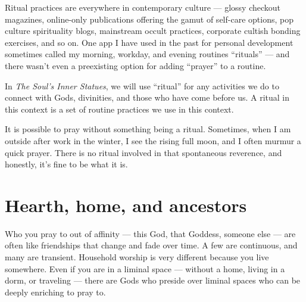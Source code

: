 \documentclass[
]{book}
\begin{document}
Ritual practices are everywhere in contemporary culture --- glossy checkout magazines, online-only publications offering the gamut of self-care options, pop culture spirituality blogs, mainstream occult practices, corporate cultish bonding exercises, and so on. One app I have used in the past for personal development sometimes called my morning, workday, and evening routines ``rituals'' --- and there wasn't even a preexisting option for adding ``prayer'' to a routine.

In \emph{The Soul's Inner Statues}, we will use ``ritual'' for any activities we do to connect with Gods, divinities, and those who have come before us. A ritual in this context is a set of routine practices we use in this context.

It is possible to pray without something being a ritual. Sometimes, when I am outside after work in the winter, I see the rising full moon, and I often murmur a quick prayer. There is no ritual involved in that spontaneous reverence, and honestly, it's fine to be what it is.

\hypertarget{hearth-home-and-ancestors}{%
\section{Hearth, home, and ancestors}\label{hearth-home-and-ancestors}}

Who you pray to out of affinity --- this God, that Goddess, someone else --- are often like friendships that change and fade over time. A few are continuous, and many are transient. Household worship is very different because you live somewhere. Even if you are in a liminal space --- without a home, living in a dorm, or traveling --- there are Gods who preside over liminal spaces who can be deeply enriching to pray to.
\end{document}
